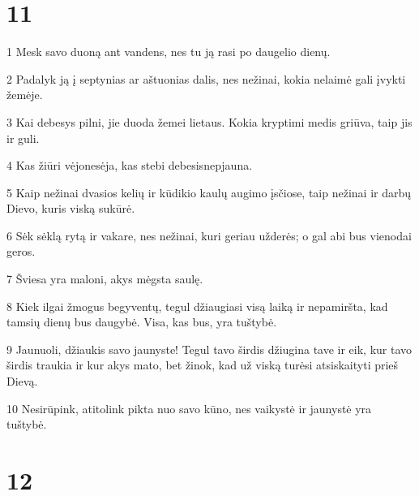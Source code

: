 \chapter{11}


\par 1 Mesk savo duoną ant vandens, nes tu ją rasi po daugelio dienų. 
\par 2 Padalyk ją į septynias ar aštuonias dalis, nes nežinai, kokia nelaimė gali įvykti žemėje. 
\par 3 Kai debesys pilni, jie duoda žemei lietaus. Kokia kryptimi medis griūva, taip jis ir guli. 
\par 4 Kas žiūri vėjo­nesėja, kas stebi debesis­nepjauna. 
\par 5 Kaip nežinai dvasios kelių ir kūdikio kaulų augimo įsčiose, taip nežinai ir darbų Dievo, kuris viską sukūrė. 
\par 6 Sėk sėklą rytą ir vakare, nes nežinai, kuri geriau užderės; o gal abi bus vienodai geros. 
\par 7 Šviesa yra maloni, akys mėgsta saulę. 
\par 8 Kiek ilgai žmogus begyventų, tegul džiaugiasi visą laiką ir nepamiršta, kad tamsių dienų bus daugybė. Visa, kas bus, yra tuštybė. 
\par 9 Jaunuoli, džiaukis savo jaunyste! Tegul tavo širdis džiugina tave ir eik, kur tavo širdis traukia ir kur akys mato, bet žinok, kad už viską turėsi atsiskaityti prieš Dievą. 
\par 10 Nesirūpink, atitolink pikta nuo savo kūno, nes vaikystė ir jaunystė yra tuštybė.



\chapter{12}


